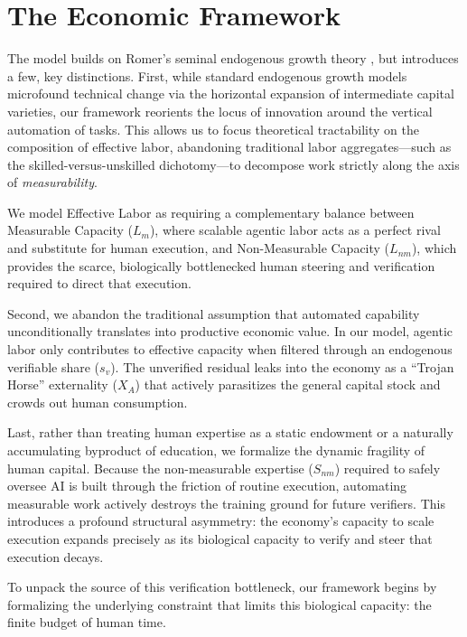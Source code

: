 \documentclass[12pt, letter]{article}
\begin{document}
\clearpage

\section{The Economic Framework}\label{sec:macroframework}

The model builds on Romer's seminal endogenous growth theory \citep{Romer90}, but introduces a few, key distinctions. First, while standard endogenous growth models microfound technical change via the horizontal expansion of intermediate capital varieties, our framework reorients the locus of innovation around the vertical automation of tasks. This allows us to focus theoretical tractability on the composition of effective labor, abandoning traditional labor aggregates—such as the skilled-versus-unskilled dichotomy—to decompose work strictly along the axis of \emph{measurability}. 

We model Effective Labor as requiring a complementary balance between Measurable Capacity ($L_m$), where scalable agentic labor acts as a perfect rival and substitute for human execution, and Non-Measurable Capacity ($L_{nm}$), which provides the scarce, biologically bottlenecked human steering and verification required to direct that execution. 

Second, we abandon the traditional assumption that automated capability unconditionally translates into productive economic value. In our model, agentic labor only contributes to effective capacity when filtered through an endogenous verifiable share ($s_v$). The unverified residual leaks into the economy as a ``Trojan Horse'' externality ($X_A$) that actively parasitizes the general capital stock and crowds out human consumption. 

Last, rather than treating human expertise as a static endowment or a naturally accumulating byproduct of education, we formalize the dynamic fragility of human capital. Because the non-measurable expertise ($S_{nm}$) required to safely oversee AI is built through the friction of routine execution, automating measurable work actively destroys the training ground for future verifiers. This introduces a profound structural asymmetry: the economy's capacity to scale execution expands precisely as its biological capacity to verify and steer that execution decays.

To unpack the source of this verification bottleneck, our framework begins by formalizing the underlying constraint that limits this biological capacity: the finite budget of human time.
\end{document}
